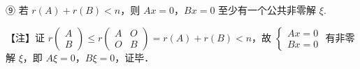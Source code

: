 
⑨ 若 $r(A)+r(B)<n$，则 $Ax=0$，$Bx=0$ 至少有一个公共非零解 $\xi$.

\begin{fnote}
【注】证 $r\begin{pmatrix}A\\B\end{pmatrix}\le r\begin{pmatrix}A&O\\O&B\end{pmatrix}=r(A)+r(B)<n$，故 $\begin{cases}Ax=0\\Bx=0\end{cases}$ 有非零解 $\xi$，即 $A\xi=0$，$B\xi=0$，证毕．
\end{fnote}

